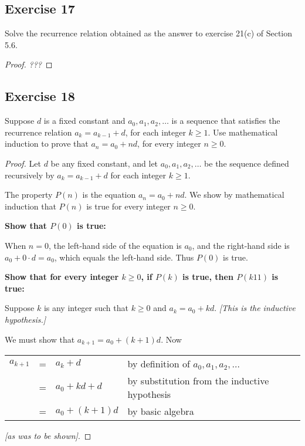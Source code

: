 \documentclass[14pt]{extarticle}
\newcommand{\cy}{\color{cyan}}
\begin{document}
    \subsection{Exercise 17}
    Solve the recurrence relation obtained as the answer to exercise 21(c) of Section 5.6.

    \begin{proof}
        {\it ???}
    \end{proof}

    \subsection{Exercise 18}
    Suppose $d$ is a fixed constant and \(a_0, a_1, a_2, \ldots\) is a sequence that satisfies the recurrence
    relation \(a_k = a_{k-1} + d\), for each integer \(k \geq 1\). Use mathematical induction to prove that
    \(a_n = a_0 + nd\), for every integer \(n \geq 0\).

    \begin{proof}
        Let $d$ be any fixed constant, and let \(a_0, a_1, a_2, \ldots\) be the sequence defined recursively by
        \(a_k = a_{k-1} + d\) for each integer \(k \geq 1\).

        The property $P(n)$ is the equation \(a_n = a_0 + nd\).
        We show by mathematical induction that $P(n)$ is true for every integer \(n \geq 0\).

            {\bf Show that \(P(0)\) is true:}

        When $n = 0$, the left-hand side of the equation is $a_0$, and the right-hand side is \(a_0 + 0 \cdot d = a_0\),
        which equals the left-hand side. Thus $P(0)$ is true.

            {\bf Show that for every integer \(k \geq 0\), if \(P(k)\) is true, then \(P(k 1 1)\) is true:}

        Suppose $k$ is any integer such that \(k \geq 0\) and \(a_k = a_0 + kd\). {\it [This is the inductive hypothesis.]}

        We must show that \(a_{k+1} = a_0 + (k + 1)d\). Now

        \begin{tabular}{rcll}
            \(a_{k+1}\) & = & \(a_k + d\)        & {\cy by definition of \(a_0, a_1, a_2, \ldots\)}    \\
                        & = & \(a_0 + kd + d\)   & {\cy by substitution from the inductive hypothesis} \\
                        & = & \(a_0 + (k + 1)d\) & {\cy by basic algebra}
        \end{tabular}

        {\it [as was to be shown]}.
    \end{proof}
\end{document}
